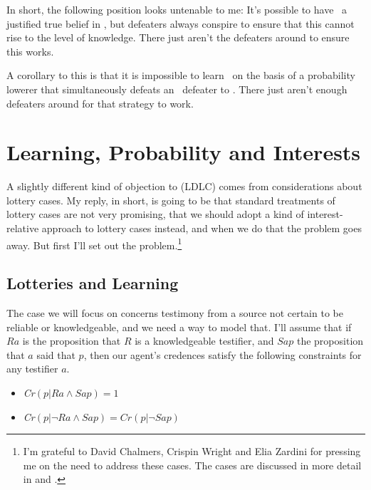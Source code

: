 \noindent In short, the following position looks untenable to me: It's possible to have \apr\ a justified true belief in \ECH, but defeaters always conspire to ensure that this cannot rise to the level of knowledge. There just aren't the defeaters around to ensure this works.

A corollary to this is that it is impossible to learn \ECH\ on the basis of a probability lowerer that simultaneously defeats an \apr\ defeater to \ECH. There just aren't enough defeaters around for that strategy to work.

\section{Learning, Probability and Interests}

A slightly different kind of objection to (LDLC) comes from considerations about lottery cases. My reply, in short, is going to be that standard treatments of lottery cases are not very promising, that we should adopt a kind of interest-relative approach to lottery cases instead, and when we do that the problem goes away. But first I'll set out the problem.\footnote{I'm grateful to David Chalmers, Crispin Wright and Elia Zardini for pressing me on the need to address these cases. The cases are discussed in more detail in \citet{MartinSmith2010} and \citet{Zardini2012}.}

\subsection{Lotteries and Learning}

The case we will focus on concerns testimony from a source not certain to be reliable or knowledgeable, and we need a way to model that. I'll assume that if $Ra$ is the proposition that $R$ is a knowledgeable testifier, and $Sap$ the proposition that $a$ said that $p$, then our agent's credences satisfy the following constraints for any testifier $a$.

\begin{itemize}
\item \textit{Cr}$(p | Ra \wedge Sap) = 1$
\item \textit{Cr}$(p | \neg Ra \wedge Sap) = \textit{Cr}(p | \neg Sap)$
\end{itemize}

